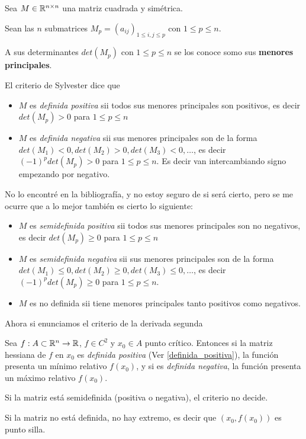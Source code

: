 \begin{theorem} \label{sylvester}

Sea $M \in \mathbb{R}^{n \times n}$ una matriz cuadrada y simétrica.

Sean las $n$ submatrices $M_p = (a_{ij})_{1 \leq i,j \leq p}$ con $1 \leq p \leq n $.

A sus determinantes $det(M_p)$ con $1 \leq p \leq n$ se los conoce somo sus \textbf{menores principales}.

El criterio de Sylvester dice que 

\begin{itemize}
\item $M$ es \emph{definida positiva} sii todos sus menores principales son positivos, es decir $det(M_p) > 0$ para $1 \leq p \leq n$

\item $M$ es \emph{definida negativa} sii sus menores principales son de la forma $det(M_1)<0, det(M_2)>0, det(M_3)<0, \ldots$, es decir $(-1)^p det(M_p) > 0$ para $1 \leq p \leq n$.  Es decir van intercambiando signo empezando por negativo.
\end{itemize}
\end{theorem}

No lo encontré en la bibliografía, y no estoy seguro de si será cierto, pero se me ocurre que a lo mejor también es cierto lo siguiente:

\begin{itemize}
\item $M$ es \emph{semidefinida positiva} sii todos sus menores principales son no negativos, es decir $det(M_p) \geq 0$ para $1 \leq p \leq n$

\item $M$ es \emph{semidefinida negativa} sii sus menores principales son de la forma $det(M_1) \leq 0, det(M_2) \geq 0, det(M_3) \leq 0, \ldots$, es decir $(-1)^p det(M_p) \geq 0$ para $1 \leq p \leq n$.

\item $M$ es no definida sii tiene menores principales tanto positivos como negativos.
\end{itemize}

Ahora si enunciamos el criterio de la derivada segunda

\begin{theorem} \label{criterio_derivada_segunda} 

Sea $f : A \subset \mathbb{R}^n \to \mathbb{R}$, $ f \in C^2$ y $x_0 \in A$ punto crítico.  Entonces si la matriz hessiana de $f$ en $x_0$ es \emph{definida positiva} (Ver \ref{definida_positiva}), la función presenta un mínimo relativo $f(x_0)$, y si es \emph{definida negativa}, la función presenta un máximo relativo $f(x_0)$.

Si la matriz está semidefinida (positiva o negativa), el criterio no decide.

Si la matriz no está definida, no hay extremo, es decir que $(x_0, f(x_0))$ es punto silla.
\end{theorem}

